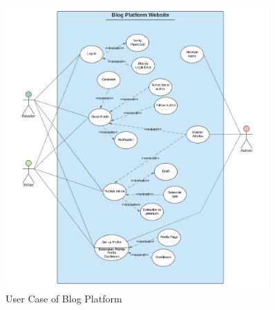 \documentclass{article}
\begin{document}
\begin{figure}[h]
\centering
\includegraphics[width=0.9\textwidth]{User_Case_Diagram.png}
\caption{User Case of Blog Platform}
\end{figure}

\noindent 
\end{document}
